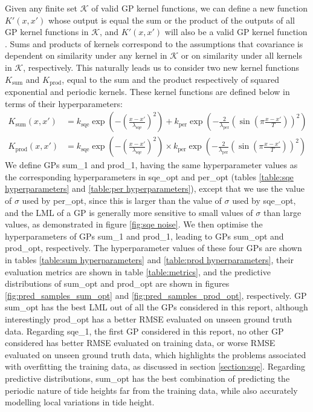 Given any finite set $\mathcal{K}$ of valid GP kernel functions, we can define a new function $K'(x, x')$ whose output is equal the sum or the product of the outputs of all GP kernel functions in $\mathcal{K}$, and $K'(x, x')$ will also be a valid GP kernel function \cite{bishop2006pattern}. Sums and products of kernels correspond to the assumptions that covariance is dependent on similarity under any kernel in $\mathcal{K}$ or on similarity under all kernels in $\mathcal{K}$, respectively. This naturally leads us to consider two new kernel functions $K_\text{sum}$ and $K_\text{prod}$, equal to the sum and the product respectively of squared exponential and periodic kernels. These kernel functions are defined below in terms of their hyperparameters:
\begin{align}
    K_\text{sum}(x, x') &= k_{\text{sqe}} \exp\left( -\left( \frac{x - x'}{\lambda_{\text{sqe}}} \right)^2 \right) + k_{\text{per}} \exp\left( -\frac{2}{\lambda_{\text{per}}} \left( \sin \left( \pi \frac{x-x'}{T} \right) \right)^2 \right) \\
    K_\text{prod}(x, x') &= k_{\text{sqe}} \exp\left( -\left( \frac{x - x'}{\lambda_{\text{sqe}}} \right)^2 \right) \times k_{\text{per}} \exp\left( -\frac{2}{\lambda_{\text{per}}} \left( \sin \left( \pi \frac{x-x'}{T} \right) \right)^2 \right)
\end{align}
We define GPs sum\_1 and prod\_1, having the same hyperparameter values as the corresponding hyperparameters in sqe\_opt and per\_opt (tables \ref{table:sqe hyperparameters} and \ref{table:per hyperparameters}), except that we use the value of $\sigma$ used by per\_opt, since this is larger than the value of $\sigma$ used by sqe\_opt, and the LML of a GP is generally more sensitive to small values of $\sigma$ than large values, as demonstrated in figure \ref{fig:sqe noise}. We then optimise the hyperparameters of GPs sum\_1 and prod\_1, leading to GPs sum\_opt and prod\_opt, respectively. The hyperparameter values of these four GPs are shown in tables \ref{table:sum hyperparameters} and \ref{table:prod hyperparameters}, their evaluation metrics are shown in table \ref{table:metrics}, and the predictive distributions of sum\_opt and prod\_opt are shown in figures \ref{fig:pred_samples_sum_opt} and \ref{fig:pred_samples_prod_opt}, respectively. GP sum\_opt has the best LML out of all the GPs considered in this report, although interestingly prod\_opt has a better RMSE evaluated on unseen ground truth data. Regarding sqe\_1, the first GP considered in this report, no other GP considered has better RMSE evaluated on training data, or worse RMSE evaluated on unseen ground truth data, which highlights the problems associated with overfitting the training data, as discussed in section \ref{section:sqe}. Regarding predictive distributions, sum\_opt has the best combination of predicting the periodic nature of tide heights far from the training data, while also accurately modelling local variations in tide height.
